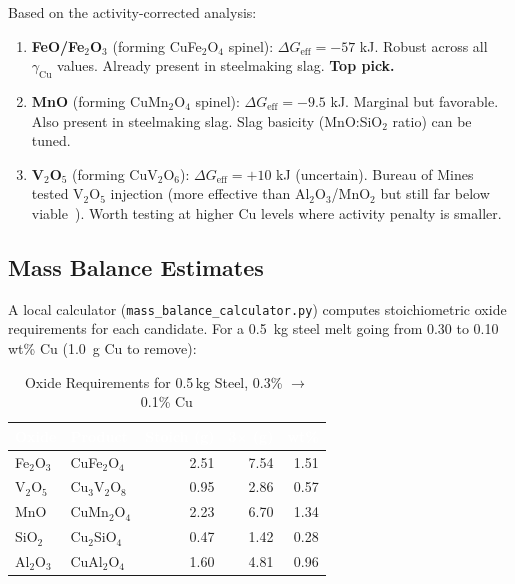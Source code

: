 \documentclass[11pt]{article}
\begin{document}
Based on the activity-corrected analysis:

\begin{enumerate}[leftmargin=*]
    \item \textbf{FeO/Fe$_2$O$_3$} (forming CuFe$_2$O$_4$ spinel): $\Delta G_{\text{eff}} = -57$ kJ. Robust across all $\gamma_{\text{Cu}}$ values. Already present in steelmaking slag. \textbf{Top pick.}

    \item \textbf{MnO} (forming CuMn$_2$O$_4$ spinel): $\Delta G_{\text{eff}} = -9.5$ kJ. Marginal but favorable. Also present in steelmaking slag. Slag basicity (MnO:SiO$_2$ ratio) can be tuned.

    \item \textbf{V$_2$O$_5$} (forming CuV$_2$O$_6$): $\Delta G_{\text{eff}} = +10$ kJ (uncertain). Bureau of Mines tested V$_2$O$_5$ injection (more effective than Al$_2$O$_3$/MnO$_2$ but still far below viable~\cite{911metallurgist}). Worth testing at higher Cu levels where activity penalty is smaller.
\end{enumerate}

\subsection{Mass Balance Estimates}

A local calculator (\texttt{mass\_balance\_calculator.py}) computes stoichiometric oxide requirements for each candidate. For a \SI{0.5}{\kilogram} steel melt going from 0.30 to 0.10\,wt\% Cu (\SI{1.0}{\gram} Cu to remove):

\begin{table}[H]
\caption{Oxide Requirements for 0.5\,kg Steel, 0.3\% $\to$ 0.1\% Cu}
\label{tab:mass_balance}
\centering
\renewcommand{\arraystretch}{1.15}
\footnotesize
\begin{tabular}{|l|l|r|r|r|}
\hline
\rowcolor{headercolor}
\textcolor{white}{\textbf{Oxide}} & \textcolor{white}{\textbf{Product}} & \textcolor{white}{\textbf{Stoich (g)}} & \textcolor{white}{\textbf{3$\times$ (g)}} & \textcolor{white}{\textbf{wt\%}} \\
\hline
Fe$_2$O$_3$ & CuFe$_2$O$_4$ & 2.51 & 7.54 & 1.51 \\
\hline
\rowcolor{altrow}
V$_2$O$_5$ & Cu$_3$V$_2$O$_8$ & 0.95 & 2.86 & 0.57 \\
\hline
MnO & CuMn$_2$O$_4$ & 2.23 & 6.70 & 1.34 \\
\hline
\rowcolor{altrow}
SiO$_2$ & Cu$_2$SiO$_4$ & 0.47 & 1.42 & 0.28 \\
\hline
Al$_2$O$_3$ & CuAl$_2$O$_4$ & 1.60 & 4.81 & 0.96 \\
\hline
\end{tabular}
\end{table}
\end{document}
